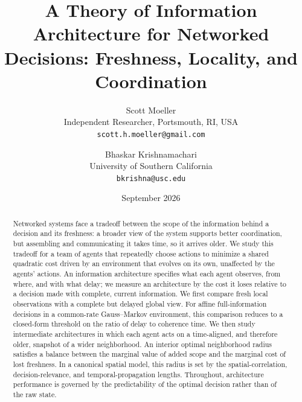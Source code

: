 \documentclass[11pt]{article}
\begin{document}
\title{A Theory of Information Architecture for Networked Decisions:
Freshness, Locality, and Coordination}
\author{
Scott Moeller\\
\small Independent Researcher, Portsmouth, RI, USA\\
\small \texttt{scott.h.moeller@gmail.com}
\and
Bhaskar Krishnamachari\\
\small University of Southern California\\
\small \texttt{bkrishna@usc.edu}
}

\date{September 2026}


\maketitle

\begin{abstract}
Networked systems face a tradeoff between the scope of the information behind a
decision and its freshness: a broader view of the system supports better
coordination, but assembling and communicating it takes time, so it arrives
older. We study this
tradeoff for a team of agents that repeatedly choose actions to minimize a
shared quadratic cost driven by an environment that evolves on its own,
unaffected by the agents' actions. An information architecture specifies what
each agent observes, from where, and with what delay; we measure an architecture
by the cost it loses relative to a decision made with complete, current
information. We first compare fresh local observations with a complete but
delayed global view. For affine full-information decisions in a common-rate
Gauss--Markov environment, this comparison reduces to a closed-form threshold on
the ratio of delay to coherence time. We then study intermediate architectures
in which each agent acts on a time-aligned, and therefore older, snapshot of a
wider neighborhood. An interior optimal neighborhood radius satisfies a balance between the
marginal value of added scope and the marginal cost of lost freshness. In a canonical
spatial model, this radius is set by the spatial-correlation,
decision-relevance, and temporal-propagation lengths. Throughout, architecture
performance is governed by the predictability of the optimal decision rather
than of the raw state.
\end{abstract}
\end{document}
